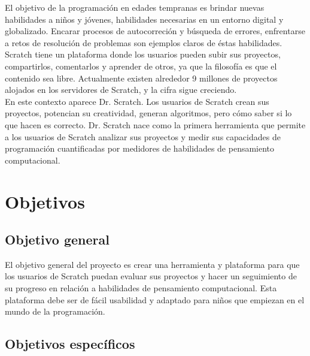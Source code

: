 \documentclass[a4paper, 12pt]{book}
\begin{document}
El objetivo de la programación en edades tempranas es brindar nuevas habilidades a niños y
jóvenes, habilidades necesarias en un entorno digital y globalizado. Encarar procesos de
autocorreción y búsqueda de errores, enfrentarse a retos de resolución de problemas son ejemplos
claros de éstas habilidades. \\

Scratch tiene un plataforma donde los usuarios pueden subir sus proyectos, compartirlos, 
comentarlos y aprender de otros, ya que la filosofía es que el contenido sea libre. Actualmente
existen alrededor 9 millones de proyectos alojados en los servidores de Scratch, y la cifra
sigue creciendo. \\

En este contexto aparece Dr. Scratch. Los usuarios de Scratch crean sus proyectos, potencian
su creatividad, generan algoritmos, pero cómo saber si lo que hacen es correcto. Dr. Scratch
nace como la primera herramienta que permite a los usuarios de Scratch analizar sus proyectos
y medir sus capacidades de programación cuantificadas por medidores de habilidades de 
pensamiento computacional. 









\cleardoublepage
\chapter{Objetivos}
\label{chap:objetivos}

\section{Objetivo general}
\label{sec:objetivo-general}

El objetivo general del proyecto es crear una herramienta y plataforma para que los
usuarios de Scratch puedan evaluar sus proyectos y hacer un seguimiento de su progreso
en relación a habilidades de pensamiento computacional. Esta plataforma debe ser
de fácil usabilidad y adaptado para niños que empiezan en el mundo de la 
programación.


\section{Objetivos específicos}
\label{sec:objetivos-especificos}
\end{document}
